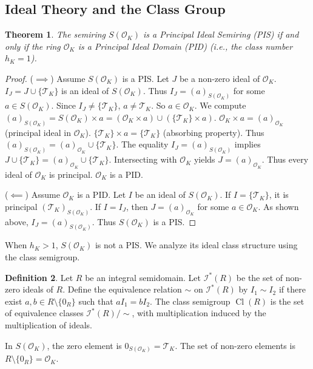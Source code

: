 \documentclass[11pt, a4paper]{article}
\theoremstyle{plain}
\newtheorem{theorem}{Theorem}[section]
\theoremstyle{definition}
\newtheorem{definition}[theorem]{Definition}
\numberwithin{equation}{section}
\newcommand{\Tobj}{\mathcal{T}} %
\DeclareMathOperator{\Cl}{Cl}
\newcommand{\OK}{\mathcal{O}_K}
\newcommand{\SOK}{S(\OK)}
\begin{document}
\subsection{Ideal Theory and the Class Group}

\begin{theorem}\label{thm:SOK_PIS}
The semiring $\SOK$ is a Principal Ideal Semiring (PIS) if and only if the ring $\OK$ is a Principal Ideal Domain (PID) (i.e., the class number $h_K=1$).
\end{theorem}
\begin{proof}
($\implies$) Assume $\SOK$ is a PIS. Let $J$ be a non-zero ideal of $\OK$. $I_J=J\cup\{\Tobj_K\}$ is an ideal of $\SOK$. Thus $I_J=(a)_{\SOK}$ for some $a \in \SOK$. Since $I_J \neq \{\Tobj_K\}$, $a \neq \Tobj_K$. So $a \in \OK$.
We compute $(a)_{\SOK} = \SOK\times a = (\OK\times a) \cup (\{\Tobj_K\}\times a)$.
$\OK\times a = (a)_{\OK}$ (principal ideal in $\OK$). $\{\Tobj_K\}\times a = \{\Tobj_K\}$ (absorbing property).
Thus $(a)_{\SOK} = (a)_{\OK} \cup \{\Tobj_K\}$.
The equality $I_J=(a)_{\SOK}$ implies $J\cup\{\Tobj_K\} = (a)_{\OK} \cup \{\Tobj_K\}$. Intersecting with $\OK$ yields $J=(a)_{\OK}$. Thus every ideal of $\OK$ is principal. $\OK$ is a PID.

($\impliedby$) Assume $\OK$ is a PID. Let $I$ be an ideal of $\SOK$. If $I=\{\Tobj_K\}$, it is principal $(\Tobj_K)_{\SOK}$. If $I=I_J$, then $J=(a)_{\OK}$ for some $a \in \OK$. As shown above, $I_J=(a)_{\SOK}$. Thus $\SOK$ is a PIS.
\end{proof}

When $h_K > 1$, $\SOK$ is not a PIS. We analyze its ideal class structure using the class semigroup.

\begin{definition}
Let $R$ be an integral semidomain. Let $\mathcal{I}^*(R)$ be the set of non-zero ideals of $R$. Define the equivalence relation $\sim$ on $\mathcal{I}^*(R)$ by $I_1 \sim I_2$ if there exist $a, b \in R\setminus\{0_R\}$ such that $a I_1 = b I_2$. The class semigroup $\Cl(R)$ is the set of equivalence classes $\mathcal{I}^*(R)/\sim$, with multiplication induced by the multiplication of ideals.
\end{definition}

In $\SOK$, the zero element is $0_{\SOK}=\Tobj_K$. The set of non-zero elements is $R\setminus\{0_R\} = \OK$.
\end{document}
